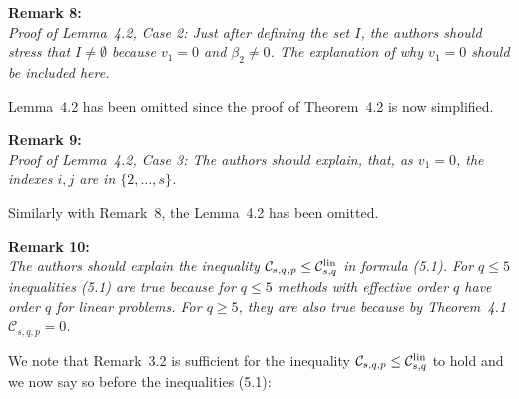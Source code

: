 \documentclass[12pt]{article}
\newcommand{\remark}[2]{\vspace{25pt} \noindent \textbf{Remark #1:\newline} \textit{#2}\vspace{15pt}}
\renewcommand{\newline}{\vspace{15pt}\\}
\newcommand{\sspcoef}{\mathcal{C}}
\newcommand{\clin}{\sspcoef^{\textnormal{lin}}_{s,q}}
\begin{document}
\remark{8}{
Proof of Lemma~4.2, Case 2: Just after defining the set $I$, the authors should stress that
$I \neq \emptyset$ because $v_1 = 0$ and $\beta_2 \neq 0$.
The explanation of why $v_1 = 0$ should be included
here.}

Lemma~4.2 has been omitted since the proof of Theorem~4.2 is now simplified.

%
%
	
\remark{9}{
Proof of Lemma~4.2, Case 3: The authors should explain, that, as $v_1 = 0$, the 
indexes $i,j$ are in $\{2,\dots,s\}$.}

Similarly with Remark~8, the Lemma~4.2 has been omitted.
%

\remark{10}{
The authors should explain the inequality $\sspcoef_{s,q,p} \leq \clin$ in formula (5.1). 
For $q \leq 5$ inequalities (5.1) are true because for $q \leq 5$ methods with effective 
order $q$ have order $q$ for linear problems. 
For $q \geq 5$, they are also true because by Theorem~4.1 $\sspcoef_{s,q,p}  = 0$.}

We note that Remark~3.2 is sufficient for the inequality 
$\sspcoef_{s,q,p} \leq \clin$ to hold and we now say so before the inequalities (5.1):
\end{document}
